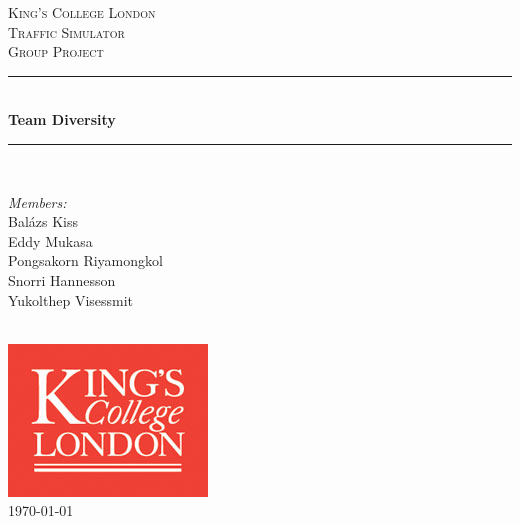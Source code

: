 \documentclass[11pt]{article}
\begin{document}

\begin{titlepage}

\newcommand{\HRule}{\rule{\linewidth}{0.5mm}}
\center
\textsc{\LARGE King's College London}\\[1.5cm]
\textsc{\Large Traffic Simulator}\\[0.5cm]
\textsc{\large Group Project}\\[0.5cm]
\HRule \\[0.4cm]
{ \huge \bfseries Team Diversity}\\[0.4cm]
\HRule \\[1.5cm]

\begin{minipage}{0.4\textwidth} \large
\begin{center}
\emph{Members:}\\
Balázs Kiss \\
Eddy Mukasa \\
Pongsakorn Riyamongkol \\
Snorri Hannesson\\
Yukolthep Visessmit 
\end{center}
\end{minipage}
\\[2cm]

\includegraphics{KingsLogo}\\[1cm] 

{\large \today}\\[3cm]

\vfill

\end{titlepage}


\tableofcontents
\end{document}
